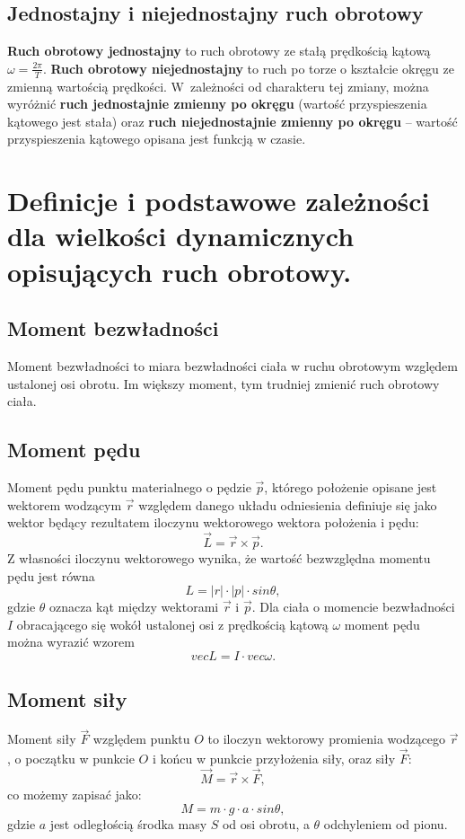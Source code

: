 \documentclass[a4paper,11pt]{article}
\begin{document}
\subsection{Jednostajny i niejednostajny ruch obrotowy}
\textbf{Ruch obrotowy jednostajny} to ruch obrotowy ze stałą prędkością kątową $\omega = \frac{2\pi}{T}$.
\textbf{Ruch obrotowy niejednostajny} to ruch po torze o kształcie okręgu ze zmienną wartością prędkości. W~zależności od charakteru tej zmiany, można wyróżnić \textbf{ruch jednostajnie zmienny po okręgu} (wartość przyspieszenia kątowego jest stała) oraz \textbf{ruch niejednostajnie zmienny po okręgu} – wartość przyspieszenia kątowego opisana jest funkcją w czasie.


\section{Definicje i podstawowe zależności dla wielkości dynamicznych opisujących ruch obrotowy.}

\subsection{Moment bezwładności}
Moment bezwładności to miara bezwładności ciała w ruchu obrotowym względem ustalonej osi obrotu. Im większy moment, tym trudniej zmienić ruch obrotowy ciała.

\subsection{Moment pędu} 
Moment pędu punktu materialnego o pędzie $\vec{p}$, którego położenie opisane jest wektorem wodzącym $\vec{r}$ względem danego układu odniesienia definiuje się jako wektor będący rezultatem iloczynu wektorowego wektora położenia i pędu:
$$\vec{L}=\vec{r} \times \vec{p}.$$
Z własności iloczynu wektorowego wynika, że wartość bezwzględna momentu pędu jest równa  
$$L=|r|\cdot |p| \cdot sin\theta,$$ 
gdzie $\theta$ oznacza kąt między wektorami $\vec{r}$ i $\vec{p}$. Dla ciała o momencie bezwładności $I$ obracającego się wokół ustalonej osi z prędkością kątową $\omega$ moment pędu można wyrazić wzorem  
$$vec{L}=I\cdot vec{\omega}.$$

\subsection{Moment siły} 
Moment siły $\vec{F}$ względem punktu $O$ to iloczyn wektorowy promienia wodzącego $\vec{r}$, o początku w punkcie $O$ i końcu w punkcie przyłożenia siły, oraz siły $\vec{F}$:  
$$\vec{M}=\vec{r} \times \vec{F},$$ 
co możemy zapisać jako:  
$$M=m\cdot g\cdot a\cdot sin\theta,$$ 
gdzie $a$ jest odległością środka masy $S$ od osi obrotu, a $\theta$ odchyleniem od pionu.
\end{document}
